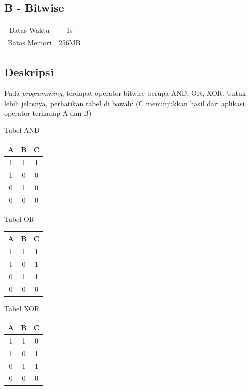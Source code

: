 \documentclass{article}
\begin{document}
\begin{center}
    \section*{B - Bitwise}

    \begin{tabular}{ | c c | }
        \hline
        Batas Waktu  & 1s \\
        Batas Memori & 256MB \\
        \hline
    \end{tabular}
\end{center}

\subsection*{Deskripsi}

Pada \textit{programming}, terdapat operator bitwise berupa AND, OR, XOR.
Untuk lebih jelasnya, perhatikan tabel di bawah: (C menunjukkan hasil dari aplikasi operator terhadap A dan B)
\begin{center}
\begin{multicols}{3}
    Tabel AND

    \begin{tabular} { | c c | c | }
        \hline
        A & B & C \\
        \hline
        1 & 1 & 1 \\
        1 & 0 & 0 \\
        0 & 1 & 0 \\
        0 & 0 & 0 \\
        \hline
    \end{tabular}

    Tabel OR

    \begin{tabular} { | c c | c | }
        \hline
        A & B & C \\
        \hline
        1 & 1 & 1 \\
        1 & 0 & 1 \\
        0 & 1 & 1 \\
        0 & 0 & 0 \\
        \hline
    \end{tabular}

    Tabel XOR

    \begin{tabular} { | c c | c | }
        \hline
        A & B & C \\
        \hline
        1 & 1 & 0 \\
        1 & 0 & 1 \\
        0 & 1 & 1 \\
        0 & 0 & 0 \\
        \hline
    \end{tabular}
\end{multicols}
\end{center}
\end{document}
